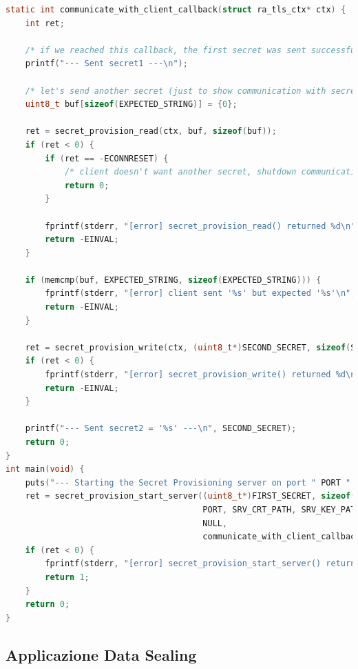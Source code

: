 \documentclass{article}
\begin{document}
\begin{lstlisting}[language=c,caption=Interazione continua con il client,label=lst:server-secret-prov-callback]
static int communicate_with_client_callback(struct ra_tls_ctx* ctx) {
    int ret;

    /* if we reached this callback, the first secret was sent successfully */
    printf("--- Sent secret1 ---\n");

    /* let's send another secret (just to show communication with secret-awaiting client) */
    uint8_t buf[sizeof(EXPECTED_STRING)] = {0};

    ret = secret_provision_read(ctx, buf, sizeof(buf));
    if (ret < 0) {
        if (ret == -ECONNRESET) {
            /* client doesn't want another secret, shutdown communication gracefully */
            return 0;
        }

        fprintf(stderr, "[error] secret_provision_read() returned %d\n", ret);
        return -EINVAL;
    }

    if (memcmp(buf, EXPECTED_STRING, sizeof(EXPECTED_STRING))) {
        fprintf(stderr, "[error] client sent '%s' but expected '%s'\n", buf, EXPECTED_STRING);
        return -EINVAL;
    }

    ret = secret_provision_write(ctx, (uint8_t*)SECOND_SECRET, sizeof(SECOND_SECRET));
    if (ret < 0) {
        fprintf(stderr, "[error] secret_provision_write() returned %d\n", ret);
        return -EINVAL;
    }

    printf("--- Sent secret2 = '%s' ---\n", SECOND_SECRET);
    return 0;
}
int main(void) {
    puts("--- Starting the Secret Provisioning server on port " PORT " ---");
    ret = secret_provision_start_server((uint8_t*)FIRST_SECRET, sizeof(FIRST_SECRET),
                                        PORT, SRV_CRT_PATH, SRV_KEY_PATH,
                                        NULL,
                                        communicate_with_client_callback);
    if (ret < 0) {
        fprintf(stderr, "[error] secret_provision_start_server() returned %d\n", ret);
        return 1;
    }
    return 0;
} 
\end{lstlisting}

\subsection{Applicazione Data Sealing}
\end{document}
